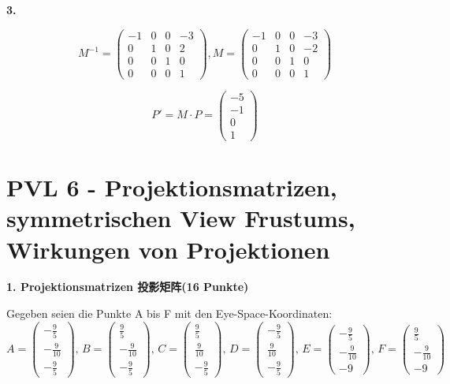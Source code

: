 \documentclass[fleqn]{article}
\begin{document}
\indent\textbf{3.}

$$M^{-1} = \begin{pmatrix} -1 & 0 & 0 & -3 \\ 0 &1&0&2\\ 0&0&1&0 \\ 0&0&0&1 \end{pmatrix}, M =\begin{pmatrix} -1 & 0 & 0 & -3 \\ 0 &1&0&-2\\ 0&0&1&0 \\ 0&0&0&1 \end{pmatrix}$$

$$P' = M \cdot P = \begin{pmatrix} -5\\-1\\0\\1 \end{pmatrix}$$

\newpage

\section{PVL 6 - Projektionsmatrizen, symmetrischen View Frustums, Wirkungen von Projektionen}


\noindent\textbf{1. Projektionsmatrizen 投影矩阵(16 Punkte)}

Gegeben seien die Punkte A bis F mit den Eye-Space-Koordinaten:
$$A=\begin{pmatrix}
    -\frac{9}{5}\\-\frac{9}{10}\\-\frac{9}{5}
\end{pmatrix},\,B=\begin{pmatrix}
    \frac{9}{5}\\-\frac{9}{10}\\-\frac{9}{5}
\end{pmatrix},\,C=\begin{pmatrix}
    \frac{9}{5}\\\frac{9}{10}\\-\frac{9}{5}
\end{pmatrix},\,D=\begin{pmatrix}
    -\frac{9}{5}\\\frac{9}{10}\\-\frac{9}{5}
\end{pmatrix},\,E=\begin{pmatrix}
    -\frac{9}{5}\\-\frac{9}{10}\\-9
\end{pmatrix},\,F=\begin{pmatrix}
    \frac{9}{5}\\-\frac{9}{10}\\-9
\end{pmatrix} $$
\end{document}
